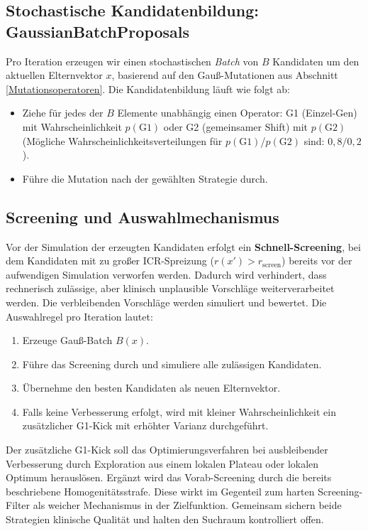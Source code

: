 \subsection{Stochastische Kandidatenbildung: GaussianBatchProposals}
Pro Iteration erzeugen wir einen stochastischen \emph{Batch} von $B$ Kandidaten um den aktuellen Elternvektor $x$, basierend auf den Gau{\ss}-Mutationen aus Abschnitt \ref{Mutationsoperatoren}. Die Kandidatenbildung läuft wie folgt ab:
\begin{itemize}
  \item Ziehe f\"ur jedes der $B$ Elemente unabh\"angig einen Operator: G1 (Einzel-Gen) mit Wahrscheinlichkeit $p(\mathrm{G1})$ oder G2 (gemeinsamer Shift) mit $p(\mathrm{G2})$ (Mögliche Wahrscheinlichkeitsverteilungen für $p(\mathrm{G1})$/$p(\mathrm{G2})$ sind: $0{,}8/0{,}2$).
  \item Führe die Mutation nach der gewählten Strategie durch.
\end{itemize}

\subsection{Screening und Auswahlmechanismus}
Vor der Simulation der erzeugten Kandidaten erfolgt ein \textbf{Schnell-Screening}, bei dem Kandidaten mit zu großer ICR-Spreizung ($r(x') > r_{\text{screen}}$) bereits vor der aufwendigen Simulation verworfen werden. Dadurch wird verhindert, dass rechnerisch zulässige, aber klinisch unplausible Vorschläge weiterverarbeitet werden. Die verbleibenden Vorschläge werden simuliert und bewertet. Die Auswahlregel pro Iteration lautet:
\begin{enumerate}
  \item Erzeuge Gauß-Batch $B(x)$.
  \item Führe das Screening durch und simuliere alle zulässigen Kandidaten.
  \item Übernehme den besten Kandidaten als neuen Elternvektor.
  \item Falls keine Verbesserung erfolgt, wird mit kleiner Wahrscheinlichkeit ein zusätzlicher G1-Kick mit erhöhter Varianz durchgeführt.
\end{enumerate}
Der zusätzliche G1-Kick soll das Optimierungsverfahren bei ausbleibender Verbesserung durch Exploration aus einem lokalen Plateau oder lokalen Optimum herauslösen. Ergänzt wird das Vorab-Screening durch die bereits beschriebene Homogenitätsstrafe. Diese wirkt im Gegenteil zum harten Screening-Filter als weicher Mechanismus in der Zielfunktion. Gemeinsam sichern beide Strategien klinische Qualität und halten den Suchraum kontrolliert offen.

